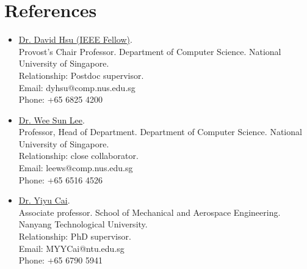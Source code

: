 \documentclass[10pt,letterpaper,sans]{moderncv}        %
\begin{document}
\section{References}
  \begin{itemize}
  \item \underline{Dr. David Hsu (IEEE Fellow)}.
  \\ Provost's Chair Professor. Department of Computer Science. National University of Singapore. 
  \\ Relationship: Postdoc supervisor.
  \\ Email: dyhsu@comp.nus.edu.sg
  \\ Phone: +65 6825 4200
  \item \underline{Dr. Wee Sun Lee}.
  \\ Professor, Head of Department. Department of Computer Science. National University of Singapore. 
  \\ Relationship: close collaborator.
  \\ Email: leews@comp.nus.edu.sg
  \\ Phone: +65 6516 4526
  \item \underline{Dr. Yiyu Cai}. 
  \\ Associate professor. School of Mechanical and Aerospace Engineering. Nanyang Technological University.
  \\ Relationship: PhD supervisor.
  \\ Email: MYYCai@ntu.edu.sg
  \\ Phone: +65 6790 5941
  \end{itemize}








\end{document}
